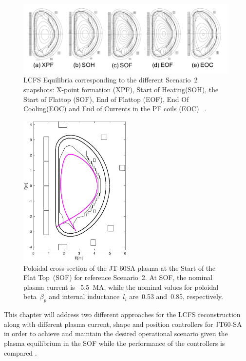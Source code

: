 \begin{figure}[h]
	\centering
	\includegraphics[width=0.99\textwidth]{Chp3/scenario2SnapShots.png}
	
	\caption{LCFS Equilibria corresponding to the different Scenario~2 snapshots:  X-point formation (XPF), Start of Heating(SOH), the Start of Flattop (SOF), End of Flattop (EOF), End Of Cooling(EOC) and  End of Currents in the PF coils (EOC) ~\cite{JT60SA:PID}. \label{Scen2}}
\end{figure}


\begin{figure}[h]
	\centering
	\includegraphics[width=0.5\textwidth]{Chp3/scenario2_SOF.eps}
	
	\caption{Poloidal cross-section of the JT-60SA plasma at the Start of the Flat Top~(SOF) for reference Scenario~2. At SOF, the nominal plasma current is ~5.5~MA, while the nominal values for poloidal beta~$\beta_p$ and internal inductance~$l_i$ are~0.53 and~0.85, respectively.	\label{SOF}}
\end{figure}



This chapter will address two different approaches for the LCFS reconstruction along  with different plasma current, shape and position controllers for JT60-SA in order to achieve and maintain the desired operational scenario given the plasma equilibrium in the SOF while the performance of the controllers is compared .



